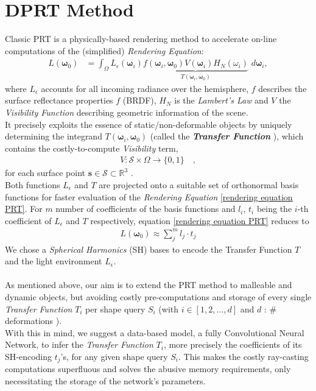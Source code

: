 \section{DPRT Method}
Classic PRT  is a physically-based rendering method to accelerate on-line computations of the (simplified) \textit{Rendering Equation}:
\begin{align}
L(\bm{\omega}_0 ) &= 
\int_{\Omega}   L_{\epsilon}(\bm{\omega}_i ) 
\underbrace{f(\bm{\omega}_i,\bm{\omega}_0) 
V(\bm{\omega}_i) H_N(\omega_i) }_{T(\bm{\omega}_i,\bm{\omega}_0) }
\,  \, d\bm{\omega}_i , 
\label{rendering equation PRT}
\end{align}
where $L_{\epsilon}$ accounts for all incoming radiance over the hemisphere, $f$  describes the surface reflectance properties $f$ (BRDF), $H_N$ is the \textit{Lambert's Law} and $V$ the \textit{Visibility Function} describing geometric information of the scene.\\
It precisely exploits the essence of static/non-deformable objects by uniquely determining the integrand $T(\bm{\omega}_i,\bm{\omega}_0)$ (called the \textbf{\textit{Transfer Function}} ), which contains the costly-to-compute  \textit{Visibility} term,
\begin{align*}
V :  \mathcal{S}  \times \Omega \rightarrow \{0,1\} \quad,
\end{align*}
for each surface point $\bm{s} \in \mathcal{S} \subset \mathbb{R}^3$ \cite{CohenBook}. 
\\
Both functions $L_{\epsilon} $ and $T$  are projected onto a suitable set of orthonormal basis functions for faster evaluation of the \textit{Rendering Equation} \ref{rendering equation PRT}. 
For $m$ number of coefficients of the basis functions and $l_i$, $t_i$ being the $i$-th coefficient of $L_{\epsilon} $ and $T$ respectively, equation \ref{rendering equation PRT} reduces to \cite{sloan2002precomputed} 
\begin{align}
L(\bm{\omega}_0 ) \approx \sum_{j}^{m} l_j \cdot t_j 
\label{Eq: Reduced Rendering Eq}
\end{align}
We chose a \textit{Spherical Harmonics} (SH) bases to encode the Transfer Function $T$ and the light environment $L_{\epsilon}$.
\\
\\
 As mentioned above, our aim is to extend the PRT method to malleable and dynamic objects, but avoiding costly pre-computations and storage of every single \textit{Transfer Function} $T_i$ per shape query $S_i$ (with $i \in [1,2,\dots, d]$ and $d$ : $\#$ deformations ). \\
With this in mind, we suggest a data-based model, a fully Convolutional Neural Network, to infer the \textit{Transfer Function} $T_i$, more precisely the coefficients of its SH-encoding $t_j$'s, for any given shape query $S_i$.
This makes the costly ray-casting computations superfluous and solves the abusive memory requirements, only necessitating the storage of the network's parameters. 
